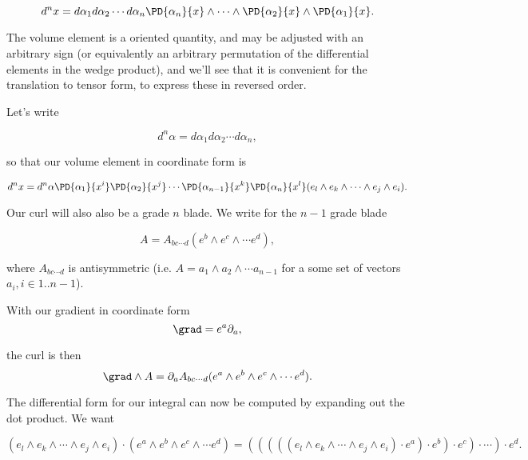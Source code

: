 \begin{equation}\label{eqn:stokesTensor:170}
d^n x
=
d\alpha_1
d\alpha_2
\cdots
d\alpha_n
\PD{\alpha_n}{x} \wedge
\cdots
\wedge
\PD{\alpha_2}{x}
\wedge
\PD{\alpha_1}{x}.
\end{equation}

The volume element is a oriented quantity, and may be adjusted with an arbitrary sign (or equivalently an arbitrary permutation of the differential elements in the wedge product), and we'll see that it is convenient for the translation to tensor form, to express these in reversed order.

Let's write

\begin{equation}\label{eqn:stokesTensor:190}
d^n \alpha = d\alpha_1 d\alpha_2 \cdots d\alpha_n,
\end{equation}

so that our volume element in coordinate form is

\begin{equation}\label{eqn:stokesTensor:210}
d^n x = d^n \alpha
\PD{\alpha_1}{x^i}
\PD{\alpha_2}{x^j}
\cdots
\PD{\alpha_{n-1}}{x^k}
\PD{\alpha_n}{x^l}
( e_l \wedge e_k \wedge \cdots \wedge e_j \wedge e_i ).
\end{equation}

Our curl will also also be a grade $n$ blade.  We write for the $n-1$ grade blade

\begin{equation}\label{eqn:stokesTensor:230}
A = A_{b c \cdots d} (e^b \wedge e^c \wedge \cdots e^d),
\end{equation}

where $A_{b c \cdots d}$ is antisymmetric (i.e. $A = a_1 \wedge a_2 \wedge \cdots a_{n-1}$ for a some set of vectors $a_i, i \in 1 .. n-1$).

With our gradient in coordinate form
\begin{equation}\label{eqn:stokesTensor:250}
\grad = e^a \partial_a,
\end{equation}

the curl is then
\begin{equation}\label{eqn:stokesTensor:270}
\grad \wedge A = \partial_a A_{b c \cdots d} (e^a \wedge e^b \wedge e^c \wedge \cdots e^d).
\end{equation}

The differential form for our integral can now be computed by expanding out the dot product.  We want

\begin{equation}\label{eqn:stokesTensor:290}
( e_l \wedge e_k \wedge \cdots \wedge e_j \wedge e_i )
\cdot
(e^a \wedge e^b \wedge e^c \wedge \cdots e^d)
=
((((( e_l \wedge e_k \wedge \cdots \wedge e_j \wedge e_i ) \cdot e^a ) \cdot e^b ) \cdot e^c ) \cdot \cdots ) \cdot e^d.
\end{equation}

